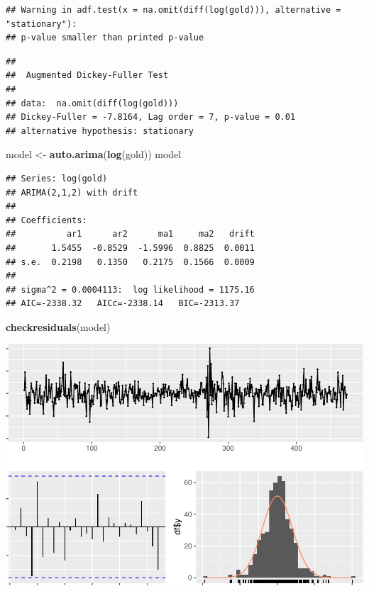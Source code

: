 \documentclass[
]{article}
\newenvironment{Shaded}{\begin{snugshade}}{\end{snugshade}}
\newcommand{\FunctionTok}[1]{\textcolor[rgb]{0.13,0.29,0.53}{\textbf{#1}}}
\newcommand{\NormalTok}[1]{#1}
\newcommand{\OtherTok}[1]{\textcolor[rgb]{0.56,0.35,0.01}{#1}}
\begin{document}
\begin{verbatim}
## Warning in adf.test(x = na.omit(diff(log(gold))), alternative = "stationary"):
## p-value smaller than printed p-value
\end{verbatim}

\begin{verbatim}
## 
##  Augmented Dickey-Fuller Test
## 
## data:  na.omit(diff(log(gold)))
## Dickey-Fuller = -7.8164, Lag order = 7, p-value = 0.01
## alternative hypothesis: stationary
\end{verbatim}

\begin{Shaded}
\begin{Highlighting}[]
\NormalTok{model }\OtherTok{\textless{}{-}} \FunctionTok{auto.arima}\NormalTok{(}\FunctionTok{log}\NormalTok{(gold))}
\NormalTok{model}
\end{Highlighting}
\end{Shaded}

\begin{verbatim}
## Series: log(gold) 
## ARIMA(2,1,2) with drift 
## 
## Coefficients:
##          ar1      ar2      ma1     ma2   drift
##       1.5455  -0.8529  -1.5996  0.8825  0.0011
## s.e.  0.2198   0.1350   0.2175  0.1566  0.0009
## 
## sigma^2 = 0.0004113:  log likelihood = 1175.16
## AIC=-2338.32   AICc=-2338.14   BIC=-2313.37
\end{verbatim}

\begin{Shaded}
\begin{Highlighting}[]
\FunctionTok{checkresiduals}\NormalTok{(model)}
\end{Highlighting}
\end{Shaded}

\begin{center}\includegraphics[width=0.8\linewidth]{Timeseries_Analysis_HW4_files/figure-latex/unnamed-chunk-13-1} \end{center}
\end{document}
